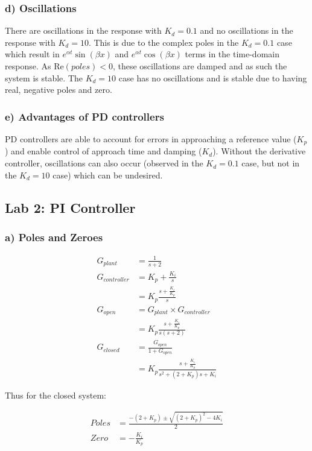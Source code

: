 \documentclass[12pt]{article}
\begin{document}
\subsubsection{d) Oscillations}
There are oscillations in the response with $K_d=0.1$ and no oscillations in the response with $K_d=10$. This is due to the complex poles in the $K_d=0.1$ case which result in $e^{\alpha t}\sin(\beta x)$ and $e^{\alpha t}\cos(\beta x)$ terms in the time-domain response. As $\text{Re}(poles)<0$, these oscillations are damped and as such the system is stable. The $K_d=10$ case has no oscillations and is stable due to having real, negative poles and zero. 

\subsubsection{e) Advantages of PD controllers}
PD controllers are able to account for errors in approaching a reference value ($K_p$) and enable control of approach time and damping ($K_d$). Without the derivative controller, oscillations can also occur (observed in the $K_d=0.1$ case, but not in the $K_d=10$ case) which can be undesired. 

\subsection{Lab 2: PI Controller}
\subsubsection{a) Poles and Zeroes}
\begin{align}
    G_{plant}&=\frac{1}{s+2}\\
    G_{controller}&=K_p+\frac{K_i}{s}\\
    &=K_p\frac{s+\frac{K_i}{K_p}}{s}\\
    G_{open}&=G_{plant}\times G_{controller}\\
    &=K_p\frac{s+\frac{K_i}{K_p}}{s(s+2)}\\
    G_{closed} &= \frac{G_{open}}{1+G_{open}}\\
    &=K_p\frac{s+\frac{K_i}{K_p}}{s^2+(2+K_p)s+K_i}
\end{align}

Thus for the closed system:

\begin{align}
    Poles &= \frac{-(2+K_p) \pm \sqrt{(2+K_p)^2-4K_i}}{2}\\
    Zero &= -\frac{K_i}{K_p}
\end{align}
\end{document}
